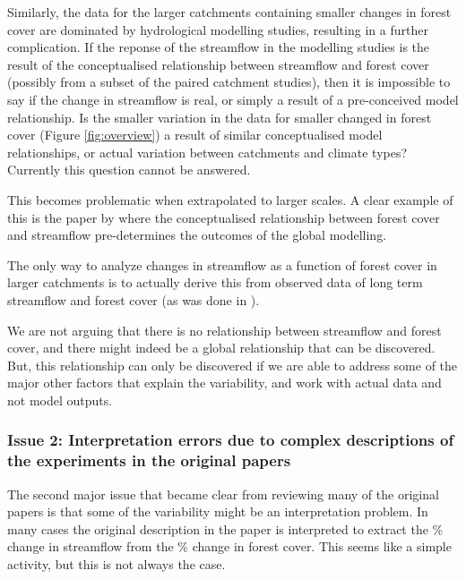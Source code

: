 \documentclass[]{elsarticle} %
\begin{document}
Similarly, the data for the larger catchments containing smaller changes in forest cover are dominated by hydrological modelling studies, resulting in a further complication. If the reponse of the streamflow in the modelling studies is the result of the conceptualised relationship between streamflow and forest cover (possibly from a subset of the paired catchment studies), then it is impossible to say if the change in streamflow is real, or simply a result of a pre-conceived model relationship. Is the smaller variation in the data for smaller changed in forest cover (Figure \ref{fig:overview}) a result of similar conceptualised model relationships, or actual variation between catchments and climate types? Currently this question cannot be answered.

This becomes problematic when extrapolated to larger scales. A clear example of this is the paper by \citet{hoekvandijke2022} where the conceptualised relationship between forest cover and streamflow pre-determines the outcomes of the global modelling.

The only way to analyze changes in streamflow as a function of forest cover in larger catchments is to actually derive this from observed data of long term streamflow and forest cover (as was done in \citet{levy2018}).

We are not arguing that there is no relationship between streamflow and forest cover, and there might indeed be a global relationship that can be discovered. But, this relationship can only be discovered if we are able to address some of the major other factors that explain the variability, and work with actual data and not model outputs.

\hypertarget{issue-2-interpretation-errors-due-to-complex-descriptions-of-the-experiments-in-the-original-papers}{%
\subsubsection{Issue 2: Interpretation errors due to complex descriptions of the experiments in the original papers}\label{issue-2-interpretation-errors-due-to-complex-descriptions-of-the-experiments-in-the-original-papers}}

The second major issue that became clear from reviewing many of the original papers is that some of the variability might be an interpretation problem. In many cases the original description in the paper is interpreted to extract the \% change in streamflow from the \% change in forest cover. This seems like a simple activity, but this is not always the case.
\end{document}
